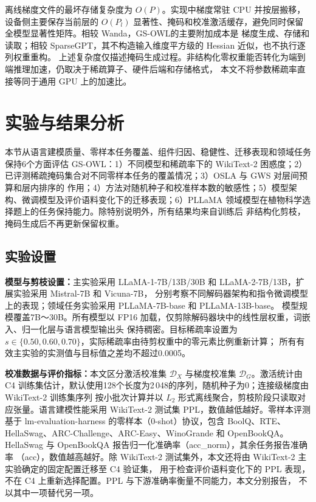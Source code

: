 \documentclass[UTF8,fontset=fandol]{ctexart}
\newcommand{\method}{GS-OWL}
\begin{document}
离线梯度文件的最坏存储复杂度为 $O(P)$。实现中梯度常驻 CPU 并按层搬移，设备侧主要保存当前层的
$O(P_l)$ 显著性、掩码和校准激活缓存，避免同时保留全模型显著性矩阵。相较 Wanda，\method 的主要附加成本是
梯度生成、存储和读取；相较 SparseGPT，其不构造输入维度平方级的 Hessian 近似，也不执行逐列权重重构。
上述复杂度仅描述掩码生成过程。非结构化零权重能否转化为端到端推理加速，仍取决于稀疏算子、硬件后端和存储格式，
本文不将参数稀疏率直接等同于通用 GPU 上的加速比。

\section{实验与结果分析}

本节从语言建模质量、零样本任务覆盖、组件归因、稳健性、迁移表现和领域任务保持6个方面评估 \method：1）不同模型和稀疏率下的
WikiText-2 困惑度；2）已评测稀疏掩码集合对不同零样本任务的覆盖情况；3）OSLA 与 GWS 对层间预算和层内排序的
作用；4）方法对随机种子和校准样本数的敏感性；5）模型架构、微调模型及评价语料变化下的迁移表现；6）PLLaMA
领域模型在植物科学选择题上的任务保持能力。除特别说明外，所有结果均来自训练后
非结构化剪枝，掩码生成后不再更新保留权重。

\subsection{实验设置}

\textbf{模型与剪枝设置：}主实验采用 LLaMA-1-7B/13B/30B 和 LLaMA-2-7B/13B，扩展实验采用 Mistral-7B 和 Vicuna-7B，
分别考察不同解码器架构和指令微调模型上的表现；领域任务实验采用 PLLaMA-7B-base 和 PLLaMA-13B-base。
模型规模覆盖7B～30B。所有模型以 FP16 加载，仅剪除解码器块中的线性层权重，词嵌入、归一化层与语言模型输出头
保持稠密。目标稀疏率设置为 $s\in\{0.50,0.60,0.70\}$，实际稀疏率由待剪权重中的零元素比例重新计算；
所有有效主实验的实测值与目标值之差均不超过0.0005。

\textbf{校准数据与评价指标：}本文区分激活校准集 $\mathcal D_X$ 与梯度校准集 $\mathcal D_G$。激活统计由
C4\cite{c4} 训练集估计，默认使用128个长度为2\,048的序列，随机种子为0；连接级梯度由 WikiText-2 训练集序列
按小批次计算并以 $L_2$ 形式离线聚合，剪枝阶段只读取对应张量。语言建模性能采用
WikiText-2\cite{wikitext} 测试集 PPL，数值越低越好。零样本评测基于 lm-evaluation-harness 的零样本（0-shot）协议，包含
BoolQ\cite{boolq}、RTE\cite{glue}、HellaSwag\cite{hellaswag}、ARC-Challenge、ARC-Easy\cite{arc}、WinoGrande\cite{winogrande}
和 OpenBookQA\cite{openbookqa}。HellaSwag 与 OpenBookQA 报告归一化准确率（acc\_norm），其余任务报告准确率
（acc），数值越高越好。除 WikiText-2 测试集外，本文还将由 WikiText-2 主实验确定的固定配置迁移至 C4 验证集，
用于检查评价语料变化下的 PPL 表现，不在 C4 上重新选择配置。PPL 与下游准确率衡量不同能力，本文分别报告，
不以其中一项替代另一项。
\end{document}
